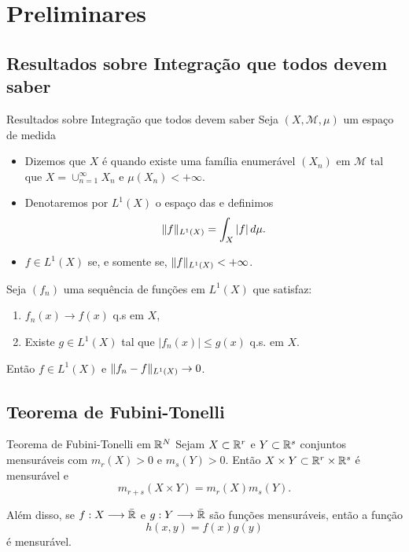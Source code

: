 \section{Preliminares}


\subsection*{Resultados sobre Integração que todos devem saber}
\begin{frame}{Resultados sobre Integração que todos devem saber}
		Seja $(X,\mathcal{M},\mu)$ um espaço de medida
		
		\begin{itemize}
			\item Dizemos que $X$ é  quando existe uma família enumerável $(X_n)$ em $ \mathcal{M}$ tal que $X=\cup_{n=1}^\infty X_n$ e $\mu(X_n)<+\infty$.
			
			\item Denotaremos por $L^1(X)$ o espaço das  e definimos
			\[\lVert f\rVert_{L^1(X)}=\int_X |f|\,d\mu.\]
			
			\item $f\in L^1(X)$ se, e somente se, $\lVert f\rVert_{L^1(X)}<+\infty$.
			
		\end{itemize}
	
	

\end{frame}

\begin{frame}
	\begin{teo}
		Seja $(f_n)$ uma sequência de funções em $L^1(X)$ que satisfaz:
		\begin{enumerate}[a]
			\item $f_n(x)\to f(x)$ q.s em $X$,
			\item Existe $g\in L^1(X)$ tal que $|f_n(x)|\leq g(x)$ q.s. em $X$.
		\end{enumerate} 
	Então $f\in L^1(X)$ e $\lVert f_n-f\rVert_{L^1(X)}\to 0$.
	\end{teo}
\end{frame}

\subsection*{Teorema de Fubini-Tonelli}
\begin{frame}{Teorema de Fubini-Tonelli em \(\mathbb{R}^N\)}
	Sejam $X\subset \mathbb{R}^r$ e $Y\subset \mathbb{R}^s$ conjuntos mensuráveis com \(m_r(X)>0\) e \(m_s(Y)>0\). Então \(X\times Y\subset \mathbb{R}^r\times \mathbb{R}^s\) é mensurável e 
	\[m_{r+s}(X\times Y)=m_r(X)m_s(Y).\]
	
	Além disso, se \(f:X\longrightarrow \bar{\mathbb{R}}\) e \(g:Y\longrightarrow\bar{\mathbb{R}}\) são funções mensuráveis, então a função
	\[h(x,y)=f(x)g(y)\]
	é mensurável.
	 
	



\end{frame}


